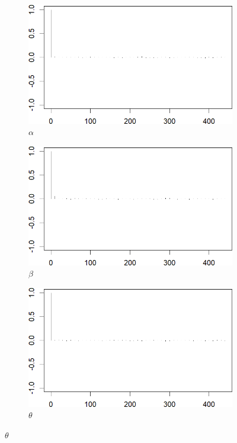 \documentclass{Class/julia}
\begin{document}
\begin{figure}[!ht]
    \centering
    \caption{Autocorrelation Plots After Thinning}
    \label{fig:8}
    \begin{subfigure}{0.45\textwidth}
        \centering
        \includegraphics[width=\textwidth]{rytgaard1990/acf_after_thinning_alpha.png}
        \caption{\( \alpha \)}
    \end{subfigure}
    \hfill
    \begin{subfigure}{0.45\textwidth}
        \centering
        \includegraphics[width=\textwidth]{rytgaard1990/acf_after_thinning_beta.png}
        \caption{\( \beta \)}
    \end{subfigure}

    \vspace{1em}

    \begin{subfigure}{0.45\textwidth}
        \centering
        \includegraphics[width=\textwidth]{rytgaard1990/acf_after_thinning_theta.png}
        \caption{\( \theta \)}
    \end{subfigure}


\end{figure}
\end{document}
